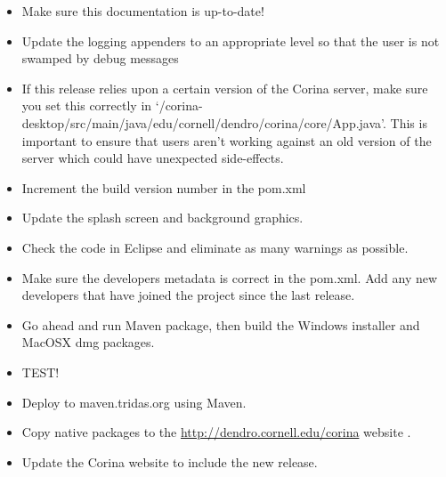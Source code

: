 \begin{itemize}
 \item Make sure this documentation is up-to-date!  
 \item Update the logging appenders to an appropriate level so that the user is not swamped by debug messages
 \item If this release relies upon a certain version of the Corina server, make sure you set this correctly in `/corina-desktop/src/main/java/edu/cornell/dendro/corina/core/App.java'.  This is important to ensure that users aren't working against an old version of the server which could have unexpected side-effects.
 \item Increment the build version number in the pom.xml
 \item Update the splash screen and background graphics.
 \item Check the code in Eclipse and eliminate as many warnings as possible.
 \item Make sure the developers metadata is correct in the pom.xml.  Add any new developers that have joined the project since the last release.
 \item Go ahead and run Maven package, then build the Windows installer and MacOSX dmg packages.
 \item TEST!
 \item Deploy to maven.tridas.org using Maven.
 \item Copy native packages to the \url{http://dendro.cornell.edu/corina} website .
 \item Update the Corina website to include the new release.
\end{itemize}


